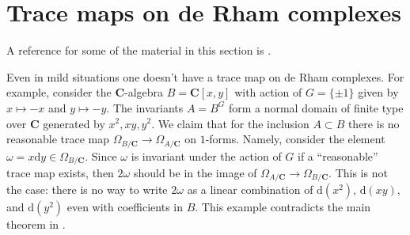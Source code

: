 \section{Trace maps on de Rham complexes}
\label{section-trace}

\noindent
A reference for some of the material in this section is \cite{Garel}.

\begin{example}
\label{example-no-trace}
Even in mild situations one doesn't have a trace map on de Rham complexes.
For example, consider the $\mathbf{C}$-algebra $B = \mathbf{C}[x, y]$ with
action of $G = \{\pm 1\}$ given by $x \mapsto -x$ and $y \mapsto -y$.
The invariants $A = B^G$ form a normal domain of finite type over $\mathbf{C}$
generated by $x^2, xy, y^2$. We claim that for the inclusion $A \subset B$
there is no reasonable trace map
$\Omega_{B/\mathbf{C}} \to \Omega_{A/\mathbf{C}}$
on $1$-forms. Namely, consider the element
$\omega = x \text{d} y \in \Omega_{B/\mathbf{C}}$.
Since $\omega$ is invariant under the action of $G$ if a ``reasonable''
trace map exists, then $2\omega$ should be in the image of
$\Omega_{A/\mathbf{C}} \to \Omega_{B/\mathbf{C}}$. This is
not the case: there is no way to write $2\omega$ as a linear
combination of $\text{d}(x^2)$, $\text{d}(xy)$, and $\text{d}(y^2)$
even with coefficients in $B$.
This example contradicts the main theorem in
\cite{Zannier}.
\end{example}














